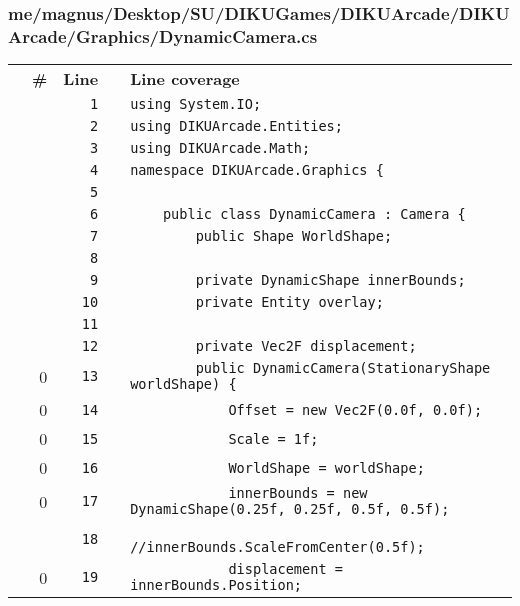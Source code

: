 \documentclass[a4paper,landscape,10pt]{article}
\begin{document}
\subsubsection{me/magnus/Desktop/SU/DIKUGames/DIKUArcade/DIKUArcade/Graphics/DynamicCamera.cs}
\begin{longtable}[l]{lrrll}
\textbf{} & \textbf{\#} & \textbf{Line} & \textbf{} & \textbf{Line coverage}\\
\cellcolor{gray} &  & \verb~1~ & & \verb~using System.IO;~\\
\cellcolor{gray} &  & \verb~2~ & & \verb~using DIKUArcade.Entities;~\\
\cellcolor{gray} &  & \verb~3~ & & \verb~using DIKUArcade.Math;~\\
\cellcolor{gray} &  & \verb~4~ & & \verb~namespace DIKUArcade.Graphics {~\\
\cellcolor{gray} &  & \verb~5~ & & \verb~~\\
\cellcolor{gray} &  & \verb~6~ & & \verb~    public class DynamicCamera : Camera {~\\
\cellcolor{gray} &  & \verb~7~ & & \verb~        public Shape WorldShape;~\\
\cellcolor{gray} &  & \verb~8~ & & \verb~~\\
\cellcolor{gray} &  & \verb~9~ & & \verb~        private DynamicShape innerBounds;~\\
\cellcolor{gray} &  & \verb~10~ & & \verb~        private Entity overlay;~\\
\cellcolor{gray} &  & \verb~11~ & & \verb~~\\
\cellcolor{gray} &  & \verb~12~ & & \verb~        private Vec2F displacement;~\\
\cellcolor{red} & 0 & \verb~13~ & & \verb~        public DynamicCamera(StationaryShape worldShape) {~\\
\cellcolor{red} & 0 & \verb~14~ & & \verb~            Offset = new Vec2F(0.0f, 0.0f);~\\
\cellcolor{red} & 0 & \verb~15~ & & \verb~            Scale = 1f;~\\
\cellcolor{red} & 0 & \verb~16~ & & \verb~            WorldShape = worldShape;~\\
\cellcolor{red} & 0 & \verb~17~ & & \verb~            innerBounds = new DynamicShape(0.25f, 0.25f, 0.5f, 0.5f);~\\
\cellcolor{gray} &  & \verb~18~ & & \verb~            //innerBounds.ScaleFromCenter(0.5f);~\\
\cellcolor{red} & 0 & \verb~19~ & & \verb~            displacement = innerBounds.Position;~\\

\end{longtable}
\end{document}
